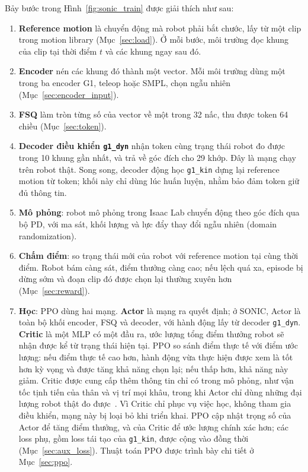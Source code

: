 \documentclass[12pt,a4paper,oneside]{report}
\newcommand{\code}[1]{\texttt{#1}}
\begin{document}
Bảy bước trong Hình~\ref{fig:sonic_train} được giải thích như sau:
\begin{enumerate}
\item \textbf{Reference motion} là chuyển động mà robot phải bắt chước, lấy từ một clip trong motion library (Mục~\ref{sec:load}). Ở mỗi bước, môi trường đọc khung của clip tại thời điểm $t$ và các khung ngay sau đó.
\item \textbf{Encoder} nén các khung đó thành một vector. Mỗi môi trường dùng một trong ba encoder G1, teleop hoặc SMPL, chọn ngẫu nhiên (Mục~\ref{sec:encoder_input}).
\item \textbf{FSQ} làm tròn từng số của vector về một trong 32 nấc, thu được token 64 chiều (Mục~\ref{sec:token}).
\item \textbf{Decoder điều khiển \code{g1\_dyn}} nhận token cùng trạng thái robot đo được trong 10 khung gần nhất, và trả về góc đích cho 29 khớp. Đây là mạng chạy trên robot thật. Song song, decoder động học \code{g1\_kin} dựng lại reference motion từ token; khối này chỉ dùng lúc huấn luyện, nhằm bảo đảm token giữ đủ thông tin.
\item \textbf{Mô phỏng}: robot mô phỏng trong Isaac Lab chuyển động theo góc đích qua bộ PD, với ma sát, khối lượng và lực đẩy thay đổi ngẫu nhiên (domain randomization).
\item \textbf{Chấm điểm}: so trạng thái mới của robot với reference motion tại cùng thời điểm. Robot bám càng sát, điểm thưởng càng cao; nếu lệch quá xa, episode bị dừng sớm và đoạn clip đó được chọn lại thường xuyên hơn (Mục~\ref{sec:reward}).
\item \textbf{Học}: PPO dùng hai mạng. \textbf{Actor} là mạng ra quyết định; ở SONIC, Actor là toàn bộ khối encoder, FSQ và decoder, với hành động lấy từ decoder \code{g1\_dyn}. \textbf{Critic} là một MLP có một đầu ra, ước lượng tổng điểm thưởng robot sẽ nhận được kể từ trạng thái hiện tại. PPO so sánh điểm thực tế với điểm ước lượng: nếu điểm thực tế cao hơn, hành động vừa thực hiện được xem là tốt hơn kỳ vọng và được tăng khả năng chọn lại; nếu thấp hơn, khả năng này giảm. Critic được cung cấp thêm thông tin chỉ có trong mô phỏng, như vận tốc tịnh tiến của thân và vị trí mọi khâu, trong khi Actor chỉ dùng những đại lượng robot thật đo được~\cite{asymac}. Vì Critic chỉ phục vụ việc học, không tham gia điều khiển, mạng này bị loại bỏ khi triển khai. PPO cập nhật trọng số của Actor để tăng điểm thưởng, và của Critic để ước lượng chính xác hơn; các loss phụ, gồm loss tái tạo của \code{g1\_kin}, được cộng vào đồng thời (Mục~\ref{sec:aux_loss}). Thuật toán PPO được trình bày chi tiết ở Mục~\ref{sec:ppo}.
\end{enumerate}
\end{document}
